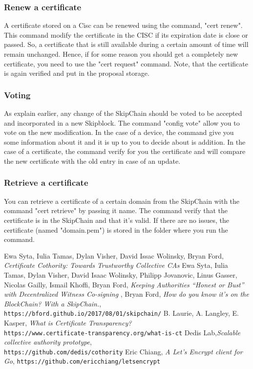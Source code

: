 \documentclass[11pt, a4paper, twoside, openright]{article}
\begin{document}
\subsubsection{Renew a certificate}
A certificate stored on a Cisc can be renewed using the command, "cert renew". This command modify the certificate in the CISC if its expiration date is close or passed. So, a certificate that is still available during a certain amount of time will remain unchanged. Hence, if for some reason you should get a completely new certificate, you need to use the "cert request" command. Note, that the certificate is again verified and put in the proposal storage. 
\subsubsection{Voting}\label{sec:vote} As explain earlier, any change of the SkipChain should be voted to be accepted and incorporated in a new Skipblock. The command "config vote" allow you to vote on the new modification. In the case of a device, the command give you some information about it and it is up to you to decide about is addition.
In the case of a certificate, the command verify for you the certificate and will compare the new certificate with the old entry in case of an update.
\subsubsection{Retrieve a certificate}
You can retrieve a certificate of a certain domain from the SkipChain with the command "cert retrieve" by passing it name. The command verify that the certificate is in the SkipChain and that it's valid. If there are no issues, the certificate (named "domain.pem") is stored in the folder where you run the command.
\begin{thebibliography}{9}

 Ewa Syta, Iulia Tamas, Dylan Visher, David Issac Wolinsky, Bryan Ford, \textit{Certificate Cothority: Towards Trustworthy Collective CAs}
  Ewa Syta, Iulia Tamas, Dylan Visher, David Isaac Wolinsky, Philipp Jovanovic, Linus Gasser, Nicolas Gailly, Ismail Khoffi, Bryan Ford,
  \textit{Keeping Authorities “Honest or Bust”
with Decentralized Witness Co-signing
},
Bryan Ford,\textit{ How do you know it's on the BlockChain? With a SkipChain.},\\\texttt{https://bford.github.io/2017/08/01/skipchain/}
 B. Laurie, A. Langley, E. Kasper, \textit{What is Certificate Transparency?} \\\texttt{https://www.certificate-transparency.org/what-is-ct}
Dedis Lab,\textit{Scalable collective authority prototype},\\\texttt{https://github.com/dedis/cothority}
Eric Chiang, \textit{A Let's Encrypt client for Go}, \texttt{https://github.com/ericchiang/letsencrypt}
\end{thebibliography}
\end{document}
